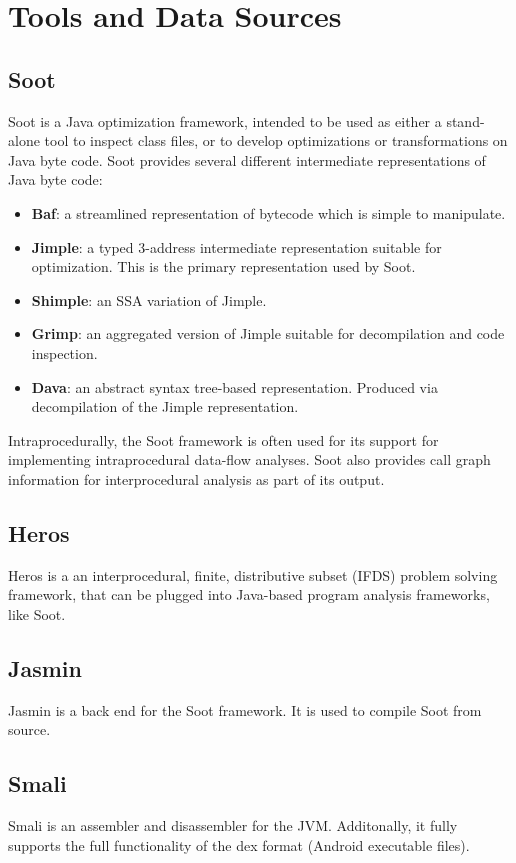 \documentclass[12pt]{article}
\begin{document}
\section{Tools and Data Sources}
\label{section:Tools and Data Sources}
\subsection{Soot}
Soot is a Java optimization framework, intended to be used as either a stand-alone tool to inspect class files, or to develop optimizations or transformations on Java byte code. Soot provides several different intermediate representations of Java byte code: \cite{lam11:_soot_java}
\begin{itemize}
    \item\textbf{Baf}: a streamlined representation of bytecode which is simple to manipulate.
    \item\textbf{Jimple}: a typed 3-address intermediate representation suitable for optimization. This is the primary representation used by Soot.
    \item\textbf{Shimple}: an SSA variation of Jimple.
    \item\textbf{Grimp}: an aggregated version of Jimple suitable for decompilation and code inspection.
    \item\textbf{Dava}: an abstract syntax tree-based representation. Produced via decompilation of the Jimple representation.
\end{itemize}
Intraprocedurally, the Soot framework is often used for its support for implementing intraprocedural data-flow analyses. Soot also provides call graph information for interprocedural analysis as part of its output. \cite{lam11:_soot_java}

\subsection{Heros}
Heros is a an interprocedural, finite, distributive subset (IFDS) problem solving framework, that can be plugged into Java-based program analysis frameworks, like Soot.

\subsection{Jasmin}
Jasmin is a back end for the Soot framework. It is used to compile Soot from source.

\subsection{Smali}
Smali is an assembler and disassembler for the JVM. Additonally, it fully supports the full functionality of the dex format (Android executable files).
\end{document}
